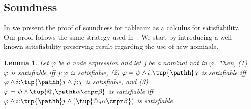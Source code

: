\documentclass[10pt,a4paper]{amsart}
\newtheorem{lem}[thm]{Lemma}
\theoremstyle{definition}
\theoremstyle{remark}
\begin{document}
\subsection{Soundness}\label{sec:soundness}

In  we present the proof of soundness for tableaux as a calculus for satisfiability.
Our proof follows the same strategy used in~\cite{Fit83,Fit96,Priest08}. 
We start by introducing a well-known satisfiability preserving result regarding the use of new nominals.




\begin{lem}
	\label{lemma:nom}
	\label{lemma:child}
        Let $\varphi$ be a node expression and let $j$ be a nominal not in $\varphi$.
		Then, (1) $\varphi$ is satisfiable iff $j{:}\varphi$ is satisfiable,
        (2) $\varphi = \psi \land i{:}\tup{\pathh}\chi$ is satisfiable iff $\varphi \land i{:}\tup{\pathh} j \land j{:}\chi$ is satisfiable, and 
        (3) $\varphi = \psi \land \tup{@_i \pathh\alpha \cmpr \beta}$ is satisfiable iff $\varphi \land i{:}\tup{\pathh} j \land (\tup{@_j \alpha \cmpr \beta})$ is satisfiable.
\end{lem}
\end{document}
